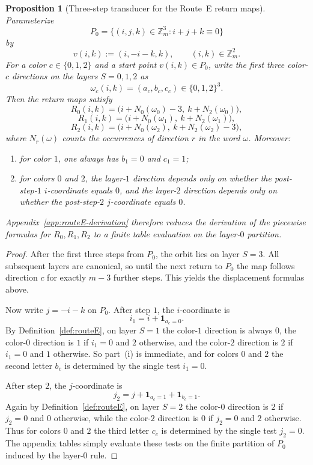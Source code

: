 \documentclass[11pt]{article}
\newtheorem{proposition}{Proposition}
\begin{document}
\begin{proposition}[Three-step transducer for the Route~E return maps]\label{prop:routeE-transducer}
Parameterize
\[
P_0=\{(i,j,k)\in \mathbb Z_m^3:i+j+k\equiv 0\}
\]
by
\[
v(i,k):=(i,-i-k,k),\qquad (i,k)\in \mathbb Z_m^2.
\]
For a color $c\in\{0,1,2\}$ and a start point $v(i,k)\in P_0$, write the first three color-$c$ directions on the layers $S=0,1,2$ as
\[
\omega_c(i,k)=(a_c,b_c,c_c)\in\{0,1,2\}^3.
\]
Then the return maps satisfy
\[
R_0(i,k)=\bigl(i+N_0(\omega_0)-3,\ k+N_2(\omega_0)\bigr),
\]
\[
R_1(i,k)=\bigl(i+N_0(\omega_1),\ k+N_2(\omega_1)\bigr),
\]
\[
R_2(i,k)=\bigl(i+N_0(\omega_2),\ k+N_2(\omega_2)-3\bigr),
\]
where $N_r(\omega)$ counts the occurrences of direction $r$ in the word $\omega$.
Moreover:
\begin{enumerate}[label=\textup{(\roman*)},leftmargin=2.5em]
\item for color $1$, one always has $b_1=0$ and $c_1=1$;
\item for colors $0$ and $2$, the layer-$1$ direction depends only on whether the post-step-$1$ $i$-coordinate equals $0$, and the layer-$2$ direction depends only on whether the post-step-$2$ $j$-coordinate equals $0$.
\end{enumerate}
Appendix~\ref{app:routeE-derivation} therefore reduces the derivation of the piecewise formulas for $R_0,R_1,R_2$ to a finite table evaluation on the layer-$0$ partition.
\end{proposition}

\begin{proof}
After the first three steps from $P_0$, the orbit lies on layer $S=3$.
All subsequent layers are canonical, so until the next return to $P_0$ the map follows direction $c$ for exactly $m-3$ further steps.
This yields the displacement formulas above.

Now write $j=-i-k$ on $P_0$.
After step $1$, the $i$-coordinate is
\[
i_1=i+\mathbf 1_{a_c=0}.
\]
By Definition~\ref{def:routeE}, on layer $S=1$ the color-$1$ direction is always $0$, the color-$0$ direction is $1$ if $i_1=0$ and $2$ otherwise, and the color-$2$ direction is $2$ if $i_1=0$ and $1$ otherwise.
So part~\textup{(i)} is immediate, and for colors $0$ and $2$ the second letter $b_c$ is determined by the single test $i_1=0$.

After step $2$, the $j$-coordinate is
\[
j_2=j+\mathbf 1_{a_c=1}+\mathbf 1_{b_c=1}.
\]
Again by Definition~\ref{def:routeE}, on layer $S=2$ the color-$0$ direction is $2$ if $j_2=0$ and $0$ otherwise, while the color-$2$ direction is $0$ if $j_2=0$ and $2$ otherwise.
Thus for colors $0$ and $2$ the third letter $c_c$ is determined by the single test $j_2=0$.
The appendix tables simply evaluate these tests on the finite partition of $P_0$ induced by the layer-$0$ rule.
\end{proof}
\end{document}
